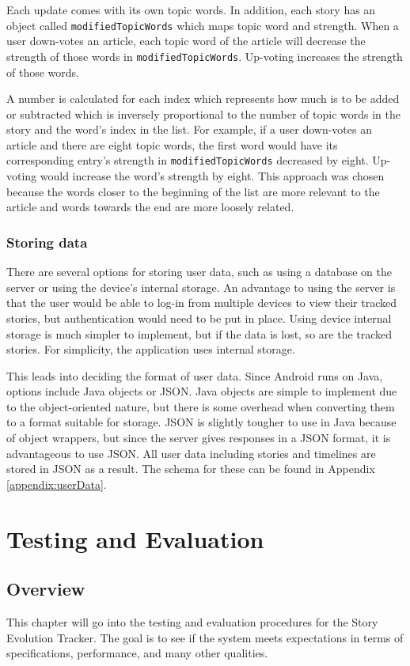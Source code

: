 \documentclass[11pt,titlepage]{report}
\begin{document}
Each update comes with its own topic words. In addition, each story has an object called \lstinline|modifiedTopicWords| which maps topic word and strength. When a user down-votes an article, each topic word of the article will decrease the strength of those words in \lstinline|modifiedTopicWords|. Up-voting increases the strength of those words. 

A number is calculated for each index which represents how much is to be added or subtracted which is inversely proportional to the number of topic words in the story and the word's index in the list. For example, if a user down-votes an article and there are eight topic words, the first word would have its corresponding entry's strength in \lstinline|modifiedTopicWords| decreased by eight. Up-voting would increase the word's strength by eight. This approach was chosen because the words closer to the beginning of the list are more relevant to the article and words towards the end are more loosely related.

\subsection{Storing data}
There are several options for storing user data, such as using a database on the server or using the device's internal storage. An advantage to using the server is that the user would be able to log-in from multiple devices to view their tracked stories, but authentication would need to be put in place. Using device internal storage is much simpler to implement, but if the data is lost, so are the tracked stories. For simplicity, the application uses internal storage.

This leads into deciding the format of user data. Since Android runs on Java, options include Java objects or JSON. Java objects are simple to implement due to the object-oriented nature, but there is some overhead when converting them to a format suitable for storage. JSON is slightly tougher to use in Java because of object wrappers, but since the server gives responses in a JSON format, it is advantageous to use JSON. All user data including stories and timelines are stored in JSON as a result. The schema for these can be found in Appendix \ref{appendix:userData}.

\chapter{Testing and Evaluation}
\section{Overview}
This chapter will go into the testing and evaluation procedures for the Story Evolution Tracker. The goal is to see if the system meets expectations in terms of specifications, performance, and many other qualities.
\end{document}
